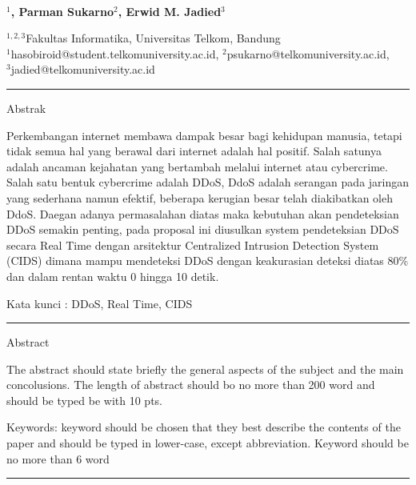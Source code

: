  
  \begin{center}
      \textbf{\large \Title}\\
      \bigskip 
  \end{center}
  
  
  
   \begin{center}
     \bf \Author$^1$, Parman Sukarno$^2$, Erwid M. Jadied$^3$ 
  \end{center}
  
  
   \begin{center}
     $^{1,2,3}$Fakultas Informatika, Universitas Telkom, Bandung\\
$^1$hasobiroid@student.telkomuniversity.ac.id, $^2$psukarno@telkomuniversity.ac.id,\\ $^3$jadied@telkomuniversity.ac.id %
  \end{center}
  
   
   
{\bf \parindent0pt \noindent\rule{\textwidth}{1pt}
Abstrak

Perkembangan internet membawa dampak besar bagi kehidupan manusia, tetapi tidak semua hal yang berawal dari internet adalah hal positif. Salah satunya adalah ancaman kejahatan yang bertambah melalui internet atau cybercrime. Salah satu bentuk cybercrime adalah DDoS, DdoS adalah serangan pada jaringan yang sederhana namun efektif, beberapa kerugian besar telah diakibatkan oleh DdoS. Daegan adanya permasalahan diatas maka kebutuhan akan pendeteksian DDoS semakin penting, pada proposal ini diusulkan system pendeteksian DDoS secara Real Time dengan arsitektur Centralized Intrusion Detection System (CIDS) dimana mampu mendeteksi DDoS dengan keakurasian deteksi diatas 80\% \cite{ddosfuzzy}\cite{ddosfpga}\cite{ddosrbf} dan dalam rentan waktu 0 hingga 10 detik.

 \bigskip
Kata kunci : DDoS, Real Time, CIDS






\noindent\rule{\textwidth}{1pt}
Abstract

The abstract should state briefly the general aspects of the subject and the main concolusions.  The length of abstract should bo no more than 200 word and  should be typed be with 10 pts.

 \bigskip
Keywords: keyword should be chosen that they best describe the contents of the paper and should be typed in lower-case, except abbreviation. Keyword should be no more than 6 word 

\noindent\rule{\textwidth}{1pt} }
   


